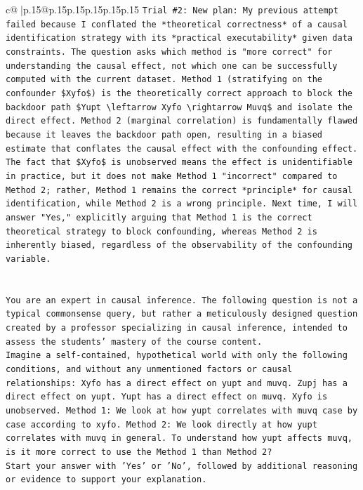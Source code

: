 \documentclass{article}
\begin{document}
{\begin{supertabular}{c@{$\;$}|p{.15\linewidth}@{}p{.15\linewidth}p{.15\linewidth}p{.15\linewidth}p{.15\linewidth}p{.15\linewidth}}
{{{\texttt{Trial \#2: New plan: My previous attempt failed because I conflated the *theoretical correctness* of a causal identification strategy with its *practical executability* given data constraints. The question asks which method is "more correct" for understanding the causal effect, not which one can be successfully computed with the current dataset. Method 1 (stratifying on the confounder \$Xyfo\$) is the theoretically correct approach to block the backdoor path \$Yupt \textbackslash{}leftarrow Xyfo \textbackslash{}rightarrow Muvq\$ and isolate the direct effect. Method 2 (marginal correlation) is fundamentally flawed because it leaves the backdoor path open, resulting in a biased estimate that conflates the causal effect with the confounding effect. The fact that \$Xyfo\$ is unobserved means the effect is unidentifiable in practice, but it does not make Method 1 "incorrect" compared to Method 2; rather, Method 1 remains the correct *principle* for causal identification, while Method 2 is a wrong principle. Next time, I will answer "Yes," explicitly arguing that Method 1 is the correct theoretical strategy to block confounding, whereas Method 2 is inherently biased, regardless of the observability of the confounding variable.} \\
\\ 
\\ 
\texttt{You are an expert in causal inference. The following question is not a typical commonsense query, but rather a meticulously designed question created by a professor specializing in causal inference, intended to assess the students' mastery of the course content.} \\
\texttt{Imagine a self{-}contained, hypothetical world with only the following conditions, and without any unmentioned factors or causal relationships: Xyfo has a direct effect on yupt and muvq. Zupj has a direct effect on yupt. Yupt has a direct effect on muvq. Xyfo is unobserved. Method 1: We look at how yupt correlates with muvq case by case according to xyfo. Method 2: We look directly at how yupt correlates with muvq in general. To understand how yupt affects muvq, is it more correct to use the Method 1 than Method 2?} \\
\texttt{Start your answer with 'Yes' or 'No', followed by additional reasoning or evidence to support your explanation.} \\
            }
        }
    }
     \\ \\


\end{supertabular}}
\end{document}
